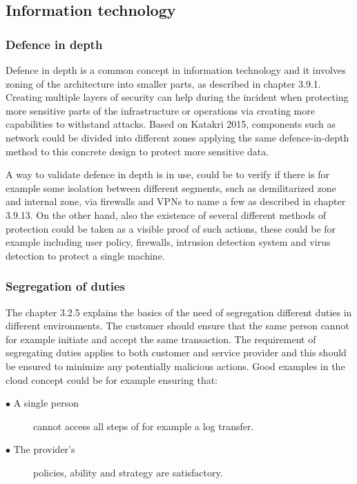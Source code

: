 \documentclass{article}
\begin{document}
\subsection{Information technology}


\subsubsection{Defence in depth}
Defence in depth is a common concept in information technology and it involves zoning of the architecture into smaller parts, as described in chapter 3.9.1. Creating multiple layers of security can help during the incident when protecting more sensitive parts of the infrastructure or operations via creating more capabilities to withstand attacks.
Based on Katakri 2015, components such as network could be divided into different zones applying the same defence-in-depth method to this concrete design to protect more sensitive data.
\par
A way to validate defence in depth is in use, could be to verify if there is for example some isolation between different segments, such as demilitarized zone and internal zone, via firewalls and VPNs to name a few as described in chapter 3.9.13. On the other hand, also the existence of several different methods of protection could be taken as a visible proof of such actions, these could be for example including user policy, firewalls, intrusion detection system and virus detection to protect a single machine.

\subsubsection{Segregation of duties}
The chapter 3.2.5 explains the basics of the need of segregation different duties in different environments. The customer should ensure that the same person cannot for example initiate and accept the same transaction. The requirement of segregating duties applies to both customer and service provider and this should be ensured to minimize any potentially malicious actions.
Good examples in the cloud concept could be for example ensuring that:
\begin{description}
	\item[$\bullet$ A single person] cannot access all steps of for example a log transfer.
	\item[$\bullet$ The provider's] policies, ability and strategy are satisfactory.
\end{description}
\end{document}
